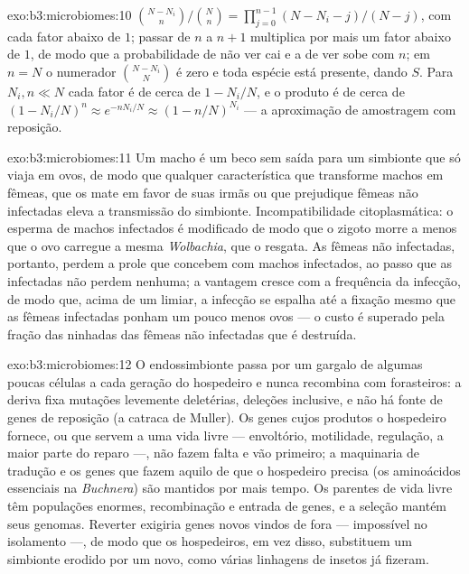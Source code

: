 \begin{solution}{exo:b3:microbiomes:10}
$\binom{N-N_{i}}{n}/\binom{N}{n} = \prod_{j=0}^{n-1}(N - N_{i} - j)/(N -
j)$, com cada fator abaixo de $1$; passar de $n$ a $n + 1$ multiplica
por mais um fator abaixo de $1$, de modo que a probabilidade de não ver
cai e a de ver sobe com $n$; em $n = N$ o numerador
$\binom{N -
N_{i}}{N}$ é zero e toda espécie está presente, dando $S$.
Para $N_{i},
n \ll N$ cada fator é de cerca de $1 - N_{i}/N$, e o
produto é de cerca de
$(1 -
N_{i}/N)^{n} \approx e^{-nN_{i}/N} \approx (1 - n/N)^{N_{i}}$ ---
a aproximação de amostragem com reposição.
\end{solution}

\begin{solution}{exo:b3:microbiomes:11}
Um macho é um beco sem saída para um simbionte que só viaja em ovos, de
modo que qualquer característica que transforme machos em fêmeas, que
os mate em favor de suas irmãs ou que prejudique fêmeas não infectadas
eleva a transmissão do simbionte. Incompatibilidade citoplasmática: o
esperma de machos infectados é modificado de modo que o zigoto morre a
menos que o ovo carregue a mesma \emph{Wolbachia}, que o resgata. As
fêmeas não infectadas, portanto, perdem a prole que concebem com machos
infectados, ao passo que as infectadas não perdem nenhuma; a vantagem
cresce com a frequência da infecção, de modo que, acima de um limiar, a
infecção se espalha até a fixação mesmo que as fêmeas infectadas ponham
um pouco menos ovos --- o custo é superado pela fração das ninhadas das
fêmeas não infectadas que é destruída.
\end{solution}

\begin{solution}{exo:b3:microbiomes:12}
O endossimbionte passa por um gargalo de algumas poucas células a cada
geração do hospedeiro e nunca recombina com forasteiros: a deriva fixa
mutações levemente deletérias, deleções inclusive, e não há fonte de
genes de reposição (a catraca de Muller). Os genes cujos produtos o
hospedeiro fornece, ou que servem a uma vida livre --- envoltório,
motilidade, regulação, a maior parte do reparo ---, não fazem falta e
vão primeiro; a maquinaria de tradução e os genes que fazem aquilo de
que o hospedeiro precisa (os aminoácidos essenciais na
\emph{Buchnera}) são mantidos por mais tempo. Os parentes de vida livre
têm populações enormes, recombinação e entrada de genes, e a seleção
mantém seus genomas. Reverter exigiria genes novos vindos de fora ---
impossível no isolamento ---, de modo que os hospedeiros, em vez disso,
substituem um simbionte erodido por um novo, como várias linhagens de
insetos já fizeram.
\end{solution}

